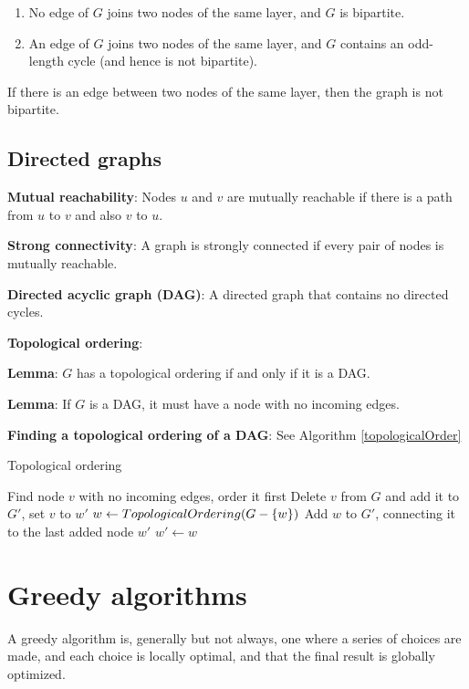 \documentclass{article}
\begin{document}
\begin{enumerate}
    \item No edge of $G$ joins two nodes of the same layer, and $G$ is bipartite.
    \item An edge of $G$ joins two nodes of the same layer, and $G$ contains an odd-length cycle (and hence is not bipartite).
\end{enumerate}

If there is an edge between two nodes of the same layer, then the graph is not bipartite.

\subsection{Directed graphs}

\textbf{Mutual reachability}: Nodes $u$ and $v$ are mutually reachable if there is a path from $u$ to $v$ and also $v$ to $u$.

\textbf{Strong connectivity}: A graph is strongly connected if every pair of nodes is mutually reachable.

\textbf{Directed acyclic graph (DAG)}: A directed graph that contains no directed cycles.

\textbf{Topological ordering}:

\textbf{Lemma}: $G$ has a topological ordering if and only if it is a DAG.

\textbf{Lemma}: If $G$ is a DAG, it must have a node with no incoming edges.

\textbf{Finding a topological ordering of a DAG}: See Algorithm \ref{topologicalOrder}

\begin{algorithm}
\caption{Topological ordering}\label{topologicalOrder}
\begin{algorithmic}[1]
    \State Find node $v$ with no incoming edges, order it first
    \State Delete $v$ from $G$ and add it to $G'$, set $v$ to $w'$
        \State $w \gets {\sc TopologicalOrdering}(G - \{w\})$
        \State Add $w$ to $G'$, connecting it to the last added node $w'$
        \State $w' \gets w$
    \EndWhile
\EndProcedure
\end{algorithmic}
\end{algorithm}

\section{Greedy algorithms}
A greedy algorithm is, generally but not always, one where a series of choices are made, and each choice is locally optimal, and that the final result is globally optimized.
\end{document}
